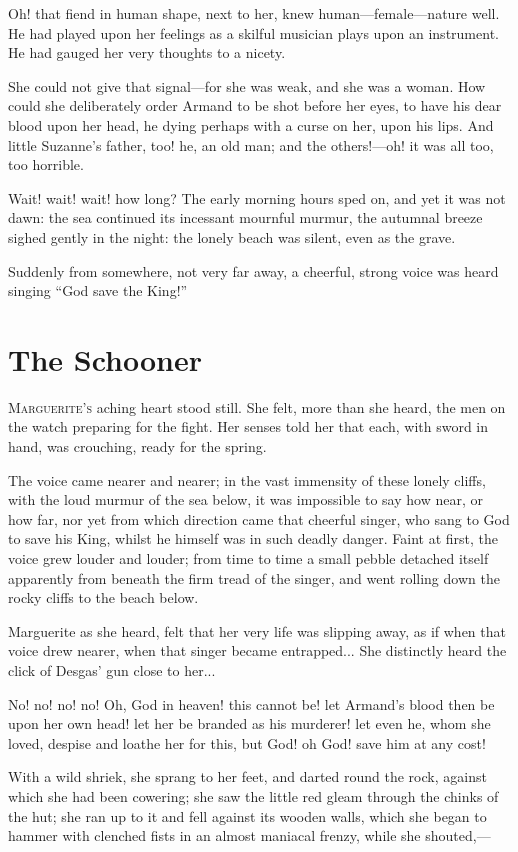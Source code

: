 \documentclass[paper=a5,BCOR=7mm,twoside,DIV=calc,12pt,usegeometry,chapterprefix,endperiod,headings=big]{scrbook}
\begin{document}
Oh! that fiend in human shape, next to her, knew human---female---nature well. He had played upon her feelings as a skilful musician plays upon an instrument. He had gauged her very thoughts to a nicety.

She could not give that signal---for she was weak, and she was a woman. How could she deliberately order Armand to be shot before her eyes, to have his dear blood upon her head, he dying perhaps with a curse on her, upon his lips. And little Suzanne's father, too! he, an old man; and the others!---oh! it was all too, too horrible.

Wait! wait! wait! how long? The early morning hours sped on, and yet it was not dawn: the sea continued its incessant mournful murmur, the autumnal breeze sighed gently in the night: the lonely beach was silent, even as the grave.

Suddenly from somewhere, not very far away, a cheerful, strong voice was heard singing \enquote{God save the King!}

\chapter{The Schooner}
\lettrine[lines=4]{M}{arguerite's} aching heart stood still. She felt, more than she heard, the men on the watch preparing for the fight. Her senses told her that each, with sword in hand, was crouching, ready for the spring.

The voice came nearer and nearer; in the vast immensity of these lonely cliffs, with the loud murmur of the sea below, it was impossible to say how near, or how far, nor yet from which direction came that cheerful singer, who sang to God to save his King, whilst he himself was in such deadly danger. Faint at first, the voice grew louder and louder; from time to time a small pebble detached itself apparently from beneath the firm tread of the singer, and went rolling down the rocky cliffs to the beach below.

Marguerite as she heard, felt that her very life was slipping away, as if when that voice drew nearer, when that singer became entrapped... She distinctly heard the click of Desgas’ gun close to her...

No! no! no! no! Oh, God in heaven! this cannot be! let Armand's blood then be upon her own head! let her be branded as his murderer! let even he, whom she loved, despise and loathe her for this, but God! oh God! save him at any cost!

With a wild shriek, she sprang to her feet, and darted round the rock, against which she had been cowering; she saw the little red gleam through the chinks of the hut; she ran up to it and fell against its wooden walls, which she began to hammer with clenched fists in an almost maniacal frenzy, while she shouted,---
\end{document}
